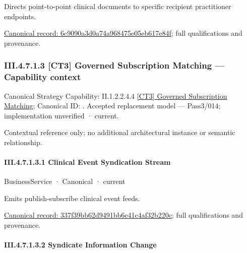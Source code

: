 Directs point-to-point clinical documents to specific recipient practitioner endpoints.


{\footnotesize \href{../../../../../../../../continuum/business/business-function/6c9090a3d0a74a968475e05eb617e84f.md}{Canonical record: 6c9090a3d0a74a968475e05eb617e84f}; full qualifications and provenance.}\par
\subsubsection*{III.4.7.1.3 [CT3] Governed Subscription Matching — Capability context}
\label{navigation:III.4.7.1.3}

{\small Canonical Strategy Capability: II.1.2.2.4.4 \hyperref[element:0f79a2e62740435b9bef0f662838ab16]{[CT3] Governed Subscription Matching}; Canonical ID: \texttt{}. Accepted replacement model — Pass3/014; implementation unverified · current.}\par
Contextual reference only; no additional architectural instance or semantic relationship.\par
\paragraph*{III.4.7.1.3.1 Clinical Event Syndication Stream}
\label{navigation:III.4.7.1.3.1}

\label{element:337f39bb62d9491bb6e41c4af32b220c}
{\small BusinessService · Canonical · current}\par

Emits publish-subscribe clinical event feeds.


{\footnotesize \href{../../../../../../../../continuum/business/business-service/337f39bb62d9491bb6e41c4af32b220c.md}{Canonical record: 337f39bb62d9491bb6e41c4af32b220c}; full qualifications and provenance.}\par
\paragraph*{III.4.7.1.3.2 Syndicate Information Change}
\label{navigation:III.4.7.1.3.2}

